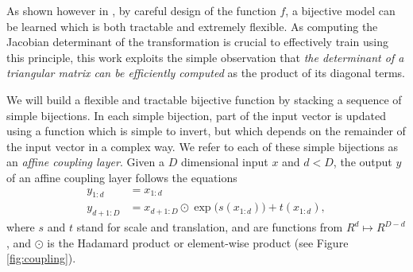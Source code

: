 \documentclass{article}
\newcommand{\jcom}[1]{\textcolor{darkgreen}{[jascha: #1]}}
\begin{document}
As shown however in \citep{dinh2014nice}, by careful design of the function $f$, a bijective model can be learned which is both tractable and extremely flexible.
As computing the Jacobian determinant of the transformation is crucial to effectively train using this principle, this work exploits the simple observation that \emph{the determinant of a triangular matrix can be efficiently computed} as the product of its diagonal terms.

We will build a flexible and tractable bijective function by stacking a sequence of simple bijections.
In each simple bijection,
part of the input vector is updated using a function which is simple to invert,
but which depends on the remainder of the input vector in a complex way.
We refer to each of these simple bijections as an \emph{affine coupling layer}.
Given a $D$ dimensional input $x$ and $d < D$, the output $y$ of an affine coupling layer follows the equations
\begin{align}
y_{1:d} &= x_{1:d}\\
y_{d+1:D} &= x_{d+1:D} \odot \exp\big(s(x_{1:d})\big) + t(x_{1:d})
,
\end{align}
where $s$ and $t$ stand for scale and translation, and are functions from $R^{d} \mapsto R^{D - d}$, and $\odot$ is the Hadamard product or element-wise product (see Figure \ref{fig:coupling}).
\end{document}
